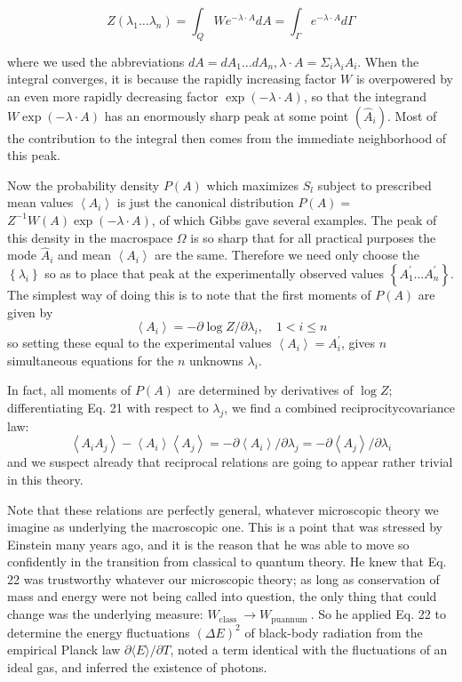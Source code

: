 \documentclass{article}
\begin{document}
$$
Z\left(\lambda_1 \ldots \lambda_n\right)=\int_Q W e^{-\lambda \cdot A} d A=\int_{\Gamma} e^{-\lambda \cdot A} d \Gamma
$$

where we used the abbreviations $d A=d A_1 \ldots d A_n, \lambda \cdot A=\Sigma_i \lambda_i A_i$. When the integral converges, it is because the rapidly increasing factor $W$ is overpowered by an even more rapidly decreasing factor $\exp (-\lambda \cdot A)$, so that the integrand $W \exp (-\lambda \cdot A)$ has an enormously sharp peak at some point $\left(\hat{A}_i\right)$. Most of the contribution to the integral then comes from the immediate neighborhood of this peak.

Now the probability density $P(A)$ which maximizes $S_l$ subject to prescribed mean values $\left\langle A_i\right\rangle$ is just the canonical distribution $P(A)=$ $Z^{-1} W(A) \exp (-\lambda \cdot A)$, of which Gibbs gave several examples. The peak of this density in the macrospace $\Omega$ is so sharp that for all practical purposes the mode $\hat{A}_i$ and mean $\left\langle A_i\right\rangle$ are the same. Therefore we need only choose the $\left\{\lambda_i\right\}$ so as to place that peak at the experimentally observed values $\left\{A_1^{\prime} \ldots A_n^{\prime}\right\}$. The simplest way of doing this is to note that the first moments of $P(A)$ are given by
$$
\left\langle A_i\right\rangle=-\partial \log Z / \partial \lambda_i, \quad 1<i \leqslant n
$$
so setting these equal to the experimental values $\left\langle A_i\right\rangle=A_i^{\prime}$, gives $n$ simultaneous equations for the $n$ unknowns $\lambda_i$.

In fact, all moments of $P(A)$ are determined by derivatives of $\log Z$; differentiating Eq. 21 with respect to $\lambda_j$, we find a combined reciprocitycovariance law:
$$
\left\langle A_i A_j\right\rangle-\left\langle A_i\right\rangle\left\langle A_j\right\rangle=-\partial\left\langle A_i\right\rangle / \partial \lambda_j=-\partial\left\langle A_j\right\rangle / \partial \lambda_i
$$
and we suspect already that reciprocal relations are going to appear rather trivial in this theory.

Note that these relations are perfectly general, whatever microscopic theory we imagine as underlying the macroscopic one. This is a point that was stressed by Einstein many years ago, and it is the reason that he was able to move so confidently in the transition from classical to quantum theory. He knew that Eq. 22 was trustworthy whatever our microscopic theory; as long as conservation of mass and energy were not being called into question, the only thing that could change was the underlying measure: $W_{\text {class }} \rightarrow W_{\text {puannum }}$. So he applied Eq. 22 to determine the energy fluctuations $(\Delta E)^2$ of black-body radiation from the empirical Planck law $\partial\langle E\rangle / \partial T$, noted a term identical with the fluctuations of an ideal gas, and inferred the existence of photons.
\end{document}
